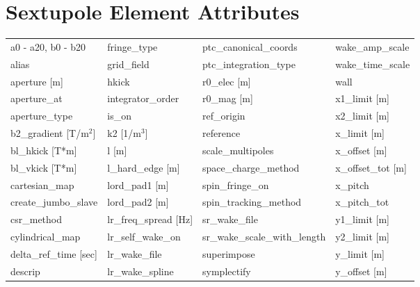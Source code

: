  \section{Sextupole Element Attributes}
 \label{s:list.sextupole}
 
 \begin{tabular}{llll} \toprule
a0 - a20, b0 - b20             & fringe_type                    & ptc_canonical_coords           & wake_amp_scale                 \\
alias                          & grid_field                     & ptc_integration_type           & wake_time_scale                \\
aperture [m]                   & hkick                          & r0_elec [m]                    & wall                           \\
aperture_at                    & integrator_order               & r0_mag [m]                     & x1_limit [m]                   \\
aperture_type                  & is_on                          & ref_origin                     & x2_limit [m]                   \\
b2_gradient [T/m$^2$]          & k2 [1/m$^3$]                   & reference                      & x_limit [m]                    \\
bl_hkick [T*m]                 & l [m]                          & scale_multipoles               & x_offset [m]                   \\
bl_vkick [T*m]                 & l_hard_edge [m]                & space_charge_method            & x_offset_tot [m]               \\
cartesian_map                  & lord_pad1 [m]                  & spin_fringe_on                 & x_pitch                        \\
create_jumbo_slave             & lord_pad2 [m]                  & spin_tracking_method           & x_pitch_tot                    \\
csr_method                     & lr_freq_spread [Hz]            & sr_wake_file                   & y1_limit [m]                   \\
cylindrical_map                & lr_self_wake_on                & sr_wake_scale_with_length      & y2_limit [m]                   \\
delta_ref_time [sec]           & lr_wake_file                   & superimpose                    & y_limit [m]                    \\
descrip                        & lr_wake_spline                 & symplectify                    & y_offset [m]                   \\

\end{tabular}
